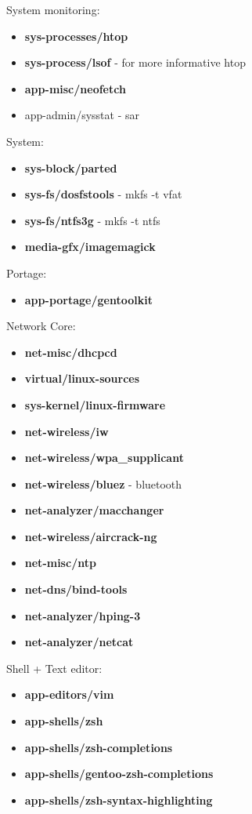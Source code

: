 \documentclass[10pt, a4paper, onecolumn, openany]{book}         %
\begin{document}
System monitoring:
\begin{itemize}
    \item \textbf{sys-processes/htop}
    \item \textbf{sys-process/lsof} - for more informative htop
    \item \textbf{app-misc/neofetch}
    \item app-admin/sysstat - sar
\end{itemize}
System:
\begin{itemize}
    \item \textbf{sys-block/parted}
    \item \textbf{sys-fs/dosfstools} - mkfs -t vfat
    \item \textbf{sys-fs/ntfs3g} - mkfs -t ntfs
    \item \textbf{media-gfx/imagemagick}
\end{itemize}
Portage:
\begin{itemize}
    \item \textbf{app-portage/gentoolkit}
\end{itemize}
Network Core:
\begin{itemize}
    \item \textbf{net-misc/dhcpcd}
    \item \textbf{virtual/linux-sources}
    \item \textbf{sys-kernel/linux-firmware}
    \item \textbf{net-wireless/iw}
    \item \textbf{net-wireless/wpa\_supplicant}
    \item \textbf{net-wireless/bluez} - bluetooth
    \item \textbf{net-analyzer/macchanger}
    \item \textbf{net-wireless/aircrack-ng}
    \item \textbf{net-misc/ntp}
    \item \textbf{net-dns/bind-tools}
    \item \textbf{net-analyzer/hping-3}
    \item \textbf{net-analyzer/netcat}
\end{itemize}
Shell + Text editor:
\begin{itemize}
    \item \textbf{app-editors/vim}
    \item \textbf{app-shells/zsh}
    \item \textbf{app-shells/zsh-completions}
    \item \textbf{app-shells/gentoo-zsh-completions}
    \item \textbf{app-shells/zsh-syntax-highlighting}
\end{itemize}
\end{document}
